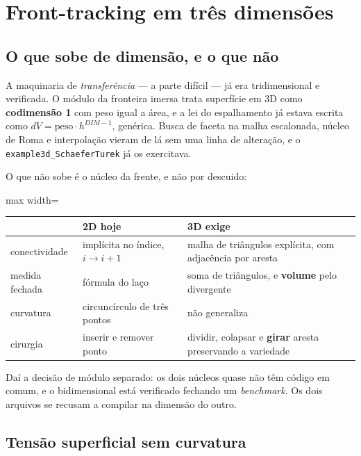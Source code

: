 \section{Front-tracking em tr\^es dimens\~oes}
\label{sec:tridim}

\subsection{O que sobe de dimens\~ao, e o que n\~ao}

A maquinaria de \emph{transfer\^encia} --- a parte dif\'icil --- j\'a era
tridimensional e verificada. O m\'odulo da fronteira imersa trata superf\'icie em
3D como \textbf{codimens\~ao 1} com peso igual a \'area, e a lei do espalhamento
j\'a estava escrita como $dV = \text{peso}\cdot h^{DIM-1}$, gen\'erica. Busca de
faceta na malha escalonada, n\'ucleo de Roma e interpola\c{c}\~ao vieram de l\'a
sem uma linha de altera\c{c}\~ao, e o \texttt{example3d\_Schaefer\-Turek} j\'a os
exercitava.

O que n\~ao sobe \'e o n\'ucleo da frente, e n\~ao por descuido:

\begin{adjustbox}{max width=\linewidth}
\begin{tabular}{>{\raggedright\arraybackslash}p{3.2cm}>{\raggedright\arraybackslash}p{4.6cm}>{\raggedright\arraybackslash}p{6.0cm}}
\toprule
& 2D hoje & 3D exige \\
\midrule
conectividade & impl\'icita no \'indice, $i \to i+1$ & malha de tri\^angulos expl\'icita, com adjac\^encia por aresta \\
medida fechada & f\'ormula do la\c{c}o & soma de tri\^angulos, e \textbf{volume} pelo divergente \\
curvatura & circunc\'irculo de tr\^es pontos & n\~ao generaliza \\
cirurgia & inserir e remover ponto & dividir, colapsar e \textbf{girar} aresta preservando a variedade \\
\bottomrule
\end{tabular}
\end{adjustbox}

Da\'i a decis\~ao de m\'odulo separado: os dois n\'ucleos quase n\~ao t\^em
c\'odigo em comum, e o bidimensional est\'a verificado fechando um
\emph{benchmark}. Os dois arquivos se recusam a compilar na dimens\~ao do outro.

\subsection{Tens\~ao superficial sem curvatura}

